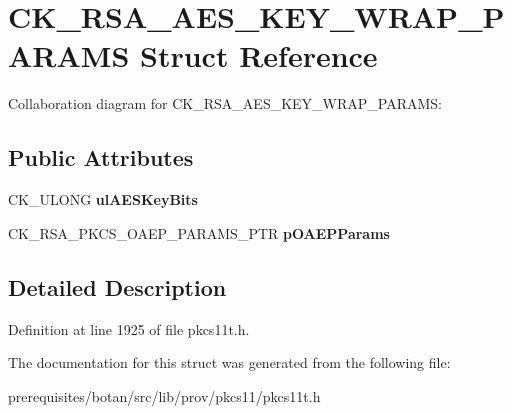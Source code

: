 \hypertarget{struct_c_k___r_s_a___a_e_s___k_e_y___w_r_a_p___p_a_r_a_m_s}{}\section{C\+K\+\_\+\+R\+S\+A\+\_\+\+A\+E\+S\+\_\+\+K\+E\+Y\+\_\+\+W\+R\+A\+P\+\_\+\+P\+A\+R\+A\+MS Struct Reference}
\label{struct_c_k___r_s_a___a_e_s___k_e_y___w_r_a_p___p_a_r_a_m_s}


Collaboration diagram for C\+K\+\_\+\+R\+S\+A\+\_\+\+A\+E\+S\+\_\+\+K\+E\+Y\+\_\+\+W\+R\+A\+P\+\_\+\+P\+A\+R\+A\+MS\+:
\subsection*{Public Attributes}
\begin{DoxyCompactItemize}
\item 
\mbox{\label{struct_c_k___r_s_a___a_e_s___k_e_y___w_r_a_p___p_a_r_a_m_s_a9d445bef9432d7eaa0b38de0ba66a3d4}} 
C\+K\+\_\+\+U\+L\+O\+NG {\bfseries ul\+A\+E\+S\+Key\+Bits}
\item 
\mbox{\label{struct_c_k___r_s_a___a_e_s___k_e_y___w_r_a_p___p_a_r_a_m_s_a6319224494833f7120b3e003b888a435}} 
C\+K\+\_\+\+R\+S\+A\+\_\+\+P\+K\+C\+S\+\_\+\+O\+A\+E\+P\+\_\+\+P\+A\+R\+A\+M\+S\+\_\+\+P\+TR {\bfseries p\+O\+A\+E\+P\+Params}
\end{DoxyCompactItemize}


\subsection{Detailed Description}


Definition at line 1925 of file pkcs11t.\+h.



The documentation for this struct was generated from the following file\+:\begin{DoxyCompactItemize}
\item 
prerequisites/botan/src/lib/prov/pkcs11/pkcs11t.\+h\end{DoxyCompactItemize}

